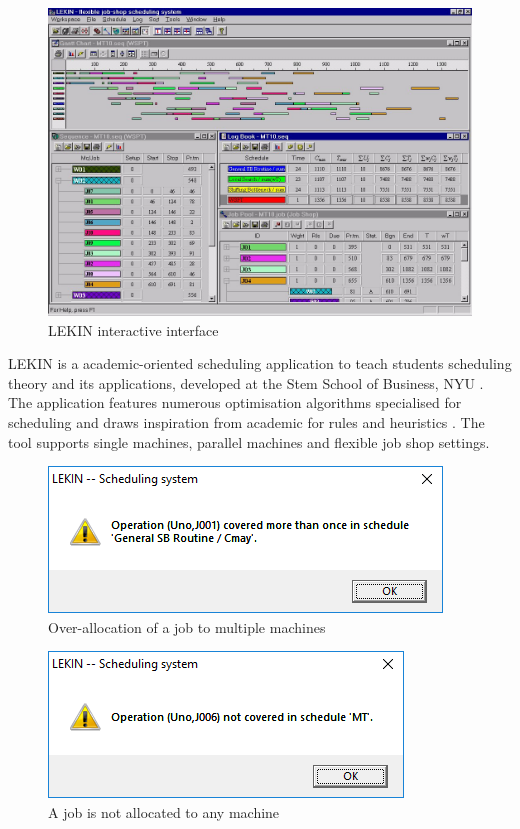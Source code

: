 \begin{figure}[H]
	\begin{center}
		\includegraphics{figures/lekin.jpg}
	\end{center}
	\caption{LEKIN interactive interface \cite{lekin}}
\end{figure}

LEKIN is a academic-oriented scheduling application to teach students scheduling theory and its applications, developed at the Stem School of Business, NYU \cite{lekin}. The application features numerous optimisation algorithms specialised for scheduling and draws inspiration from academic for rules and heuristics \cite{sta}. The tool supports single machines, parallel machines and flexible job shop settings.

\begin{figure}[H]
	\begin{center}
		\includegraphics[scale=0.8]{figures/lekinerror1.png}
	\end{center}
	\caption{Over-allocation of a job to multiple machines}
\end{figure}

\begin{figure}[H]
	\begin{center}
		\includegraphics[scale=0.8]{figures/lekinerror2.png}
	\end{center}
	\caption{A job is not allocated to any machine}
\end{figure}

